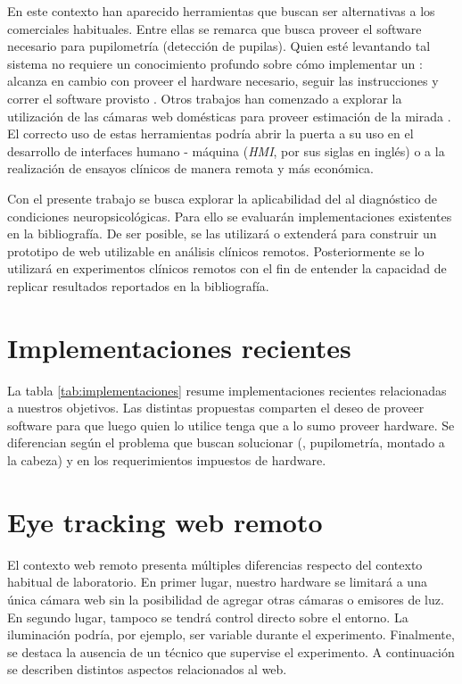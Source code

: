 En este contexto han aparecido herramientas que buscan ser alternativas a los
\eyetrackers comerciales habituales.
Entre ellas se remarca \pupilext que busca proveer el software necesario para
pupilometría (detección de pupilas).
Quien esté levantando tal sistema no requiere un conocimiento profundo sobre
cómo implementar un \eyetracker: alcanza en cambio con proveer el hardware
necesario, seguir las instrucciones y correr el software provisto
\cite{zandi_2021_pupilext}.
Otros trabajos han comenzado a explorar la utilización de las cámaras web
domésticas para proveer estimación de la mirada \cite{xu_2015_turker_gaze,
papoutsaki_2016_webgazer, huang_2016_pace}.
El correcto uso de estas herramientas podría abrir la puerta a su uso en el
desarrollo de interfaces humano - máquina (\textit{HMI}, por sus siglas en
inglés) o a la realización de ensayos clínicos de manera remota y más
económica.

Con el presente trabajo se busca explorar la aplicabilidad del \eyetracking
\online al diagnóstico de condiciones neuropsicológicas.
Para ello se evaluarán implementaciones existentes en la bibliografía.
De ser posible, se las utilizará o extenderá para construir un prototipo de
\eyetracker web utilizable en análisis clínicos remotos.
Posteriormente se lo utilizará en experimentos clínicos remotos con el fin de
entender la capacidad de replicar resultados reportados en la bibliografía.

\section{Implementaciones recientes}

La tabla \ref{tab:implementaciones} resume implementaciones recientes relacionadas
a nuestros objetivos.
Las distintas propuestas comparten el deseo de proveer software para que luego
quien lo utilice tenga que a lo sumo proveer hardware.
Se diferencian según el problema que buscan solucionar (\eg, pupilometría,
\eyetracking montado a la cabeza) y en los requerimientos impuestos de
hardware.



\section{Eye tracking web remoto}

El contexto web remoto presenta múltiples diferencias respecto del contexto
habitual de laboratorio.
En primer lugar, nuestro hardware se limitará a una única cámara web sin la
posibilidad de agregar otras cámaras o emisores de luz.
En segundo lugar, tampoco se tendrá control directo sobre el entorno.
La iluminación podría, por ejemplo, ser variable durante el experimento.
Finalmente, se destaca la ausencia de un técnico que supervise el experimento.
A continuación se describen distintos aspectos relacionados al \eyetracking web.

